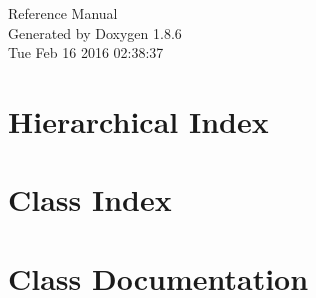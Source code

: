 \documentclass[twoside]{book}
\newcommand{\clearemptydoublepage}{%
  \newpage{\pagestyle{empty}\cleardoublepage}%
}
\begin{document}
\hypersetup{pageanchor=false}
\begin{titlepage}
\vspace*{7cm}
\begin{center}%
{\Large Reference Manual}\\
\vspace*{1cm}
{\large Generated by Doxygen 1.8.6}\\
\vspace*{0.5cm}
{\small Tue Feb 16 2016 02:38:37}\\
\end{center}
\end{titlepage}
\clearemptydoublepage
\tableofcontents
\clearemptydoublepage
{}
\hypersetup{pageanchor=true}

\chapter{Hierarchical Index}

\chapter{Class Index}

\chapter{Class Documentation}


























\newpage
{}
{}
\printindex
\end{document}
